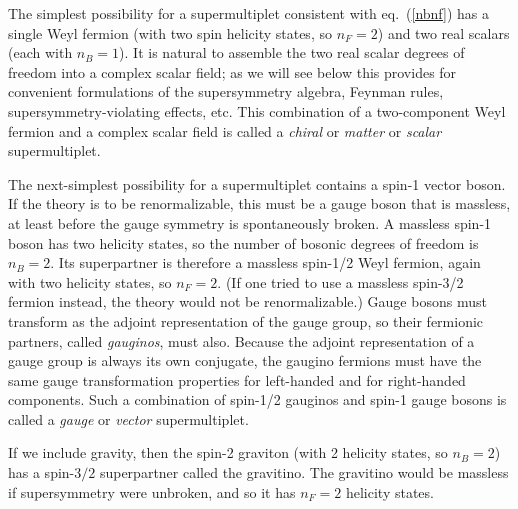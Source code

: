 \documentclass[11pt]{article}
\begin{document}
The simplest possibility for a supermultiplet consistent with
eq.~(\ref{nbnf}) has a single Weyl fermion (with two spin helicity states,
so $n_F=2$) and two real scalars (each with $n_B=1$). It is natural to
assemble the two real scalar degrees of freedom into a complex scalar
field; as we will see below this provides for convenient formulations of
the supersymmetry algebra, Feynman rules, supersymmetry-violating effects,
etc. This combination of a two-component Weyl fermion and a complex scalar
field is called a {\it chiral} or {\it matter} or {\it scalar}
supermultiplet. 

The next-simplest possibility for a supermultiplet contains a spin-1
vector boson. If the theory is to be renormalizable, this must be a gauge
boson that is massless, at least before the gauge symmetry is
spontaneously broken. A massless spin-1 boson has two helicity states, so
the number of bosonic degrees of freedom is $n_B=2$. Its superpartner is
therefore a massless spin-1/2 Weyl fermion, again with two helicity
states, so $n_F=2$. (If one tried to use a massless spin-3/2 fermion
instead, the theory would not be renormalizable.) Gauge bosons must
transform as the adjoint representation of the gauge group, so their
fermionic partners, called {\it gauginos}, must also. Because the adjoint
representation of a gauge group is always its own conjugate, the gaugino
fermions must have the same gauge transformation properties for
left-handed and for right-handed components. Such a combination of
spin-1/2 gauginos and spin-1 gauge bosons is called a {\it gauge} or {\it
vector} supermultiplet. 

If we include gravity, then the spin-2 graviton (with 2 helicity states,
so $n_B=2$) has a spin-$3/2$ superpartner called the gravitino. The
gravitino would be massless if supersymmetry were unbroken, and so it has
$n_F=2$ helicity states. 
\end{document}
